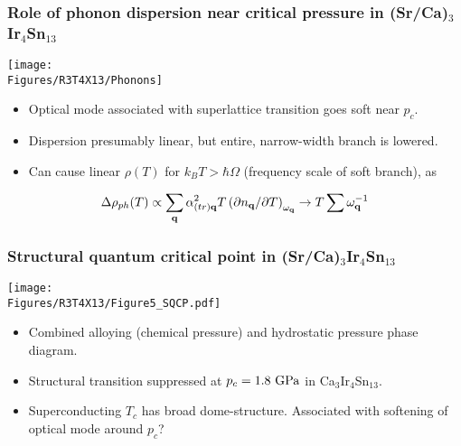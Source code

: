 \begin{frame}[label=CIS-phonons]
\frametitle{Role of phonon dispersion near critical pressure in (Sr/Ca)$_3$Ir$_4$Sn$_{13}$}
\centerline{\texttt{[image: \\Figures/R3T4X13/Phonons]}}
\begin{itemize}
\item
Optical mode associated with superlattice transition goes soft near
$p_c$.

\item
Dispersion presumably linear, but entire, narrow-width branch is
lowered.

\item
Can cause linear $\rho(T)$ for $k_B T>\hbar \Omega$ (frequency scale
of soft branch), as
\end{itemize}
\[ \Delta\rho_{ph}(T) \propto \sum_{\bf q} \alpha_{(tr) \bf q}^2 T \left(\partial n_{\bf
  q}/\partial T\right)_{\omega_{\bf q}} \rightarrow  T \sum
  \omega_{\bf q}^{-1} \]


\end{frame}

\begin{frame}[label=CIS-3]
\frametitle{Structural quantum critical point in (Sr/Ca)$_3$Ir$_4$Sn$_{13}$}
\centerline{\texttt{[image: \\Figures/R3T4X13/Figure5\_SQCP.pdf]}}

\begin{itemize}
\item
Combined alloying (chemical pressure) and hydrostatic pressure phase diagram.

\item
Structural transition suppressed at $p_c = 1.8 ~{\rm GPa}$ in Ca$_3$Ir$_4$Sn$_{13}$.

\item
Superconducting $T_c$ has broad dome-structure. Associated with softening of optical mode around $p_c$?

\end{itemize}
\end{frame}



